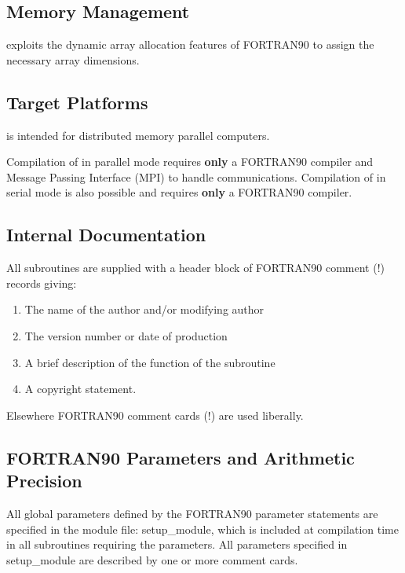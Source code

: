 \subsection{Memory Management}

\D exploits the dynamic array allocation features of FORTRAN90
 to assign the necessary array dimensions.

\subsection{Target Platforms}

\D is intended for distributed memory parallel computers.

Compilation of \D in parallel mode requires {\bf only} a FORTRAN90
 compiler and Message Passing Interface (MPI) to handle
communications.  Compilation of \D in serial mode is also possible
and requires {\bf only} a FORTRAN90  compiler.

\subsection{Internal Documentation}

All subroutines are supplied with a header block of FORTRAN90
 comment (!) records giving:
\begin{enumerate}
\item The name of the author and/or modifying author
\item The version number or date of production
\item A brief description of the function of the subroutine
\item A copyright statement.
\end{enumerate}

\noindent Elsewhere FORTRAN90 comment cards (!)
are used liberally.

\subsection{FORTRAN90 Parameters and Arithmetic Precision}
\label{precision}

All global parameters defined by the FORTRAN90
parameter statements are specified in the
module file: {\sc setup\_module}, which is included at compilation
time in all subroutines requiring the parameters.  All parameters
specified in {\sc setup\_module} are described by one or more
comment cards.

